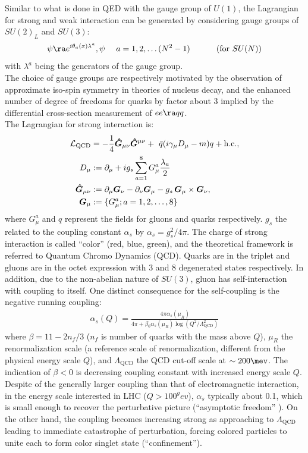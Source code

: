 Similar to what is done in QED with the gauge group of $U(1)$, the Lagrangian for strong and weak interaction can be generated by considering gauge groups of $SU(2)_L$ and $SU(3)$:
$$
\psi \ra e^{i \theta_a(x) \lambda^a}, \psi \,\,\,\,\,\,\,\, a=1,2,\dots (N^2-1) \,\,\,\,\,\, \mbox{\phantom{MM}  (for $SU(N)$)} 
$$
with $\lambda^a$ being the generators of the gauge group. \\
The choice of gauge groups are respectively motivated by the observation of approximate iso-spin symmetry in theories of nucleus decay, and the enhanced number of degree of freedoms  for quarks by factor about 3 implied by the differential cross-section measurement of $ee\ra qq$. \\

The Lagrangian for strong interaction is:
\begin{align}
\mathcal{L}_{\mathrm{QCD}} & = -\frac{1}{4} \bm{\hat{G}}_{\mu\nu} \bm{\hat{G}}^{\mu\nu} + \,\, \bar{q}(i \gamma_\mu D_\mu - m) q + \mathrm{h.c.}, \nonumber \\
D_\mu & := \partial_\mu + ig_s \sum_{a=1}^8 G^a_{\mu}\frac{\lambda_a}{2} \nonumber \\
\bm{\hat{G}}_{\mu\nu} & := \partial_\mu \bm{G}_\nu - \partial_\nu \bm{G}_\mu - g_s \, \bm{G}_\mu \times \bm{G}_\nu, \nonumber \\
\bm{G}_\mu & := \{G^a_\mu; a=1,2,\dots,8\}
\label{eq::QCDLag}
\end{align}
where $G^a_\mu$ and $q$ represent the fields for gluons and quarks respectively.
$g_s$ the related to the coupling constant $\alpha_s$ by $\alpha_s = g_s^2/4\pi$. 
The charge of strong interaction is called ``color'' (red, blue, green), and the theoretical framework is referred to Quantum Chromo Dynamics (QCD). 
Quarks are in the triplet and gluons are in the octet expression with 3 and 8 degenerated states respectively.
In addition, due to the non-abelian nature of $SU(3)$, gluon has self-interaction with coupling to itself. One distinct consequence for the self-coupling is the negative running coupling:
\begin{align}
\alpha_s(Q) = \frac{4\pi\alpha_s(\mu_R)}{4\pi + \beta_0 \alpha_s(\mu_R)\log{(Q^2/\Lambda^2_{\mathrm{QCD}})} }
\end{align}
where $\beta = 11 -2n_f/3$ ($n_f$ is number of quarks with the mass above $Q$), $\mu_R$ the renormalization scale (a reference scale of renormalization, different from the physical energy scale $Q$), and $\Lambda_{\mathrm{QCD}}$ the QCD cut-off scale at $\sim 200\mev$. The indication of $\beta<0$ is decreasing coupling constant with increased energy scale $Q$.
Despite of the generally larger coupling than that of electromagnetic interaction, in the energy scale interested in LHC ($Q>100^gev$), $\alpha_s$ typically about 0.1, which is small enough to recover the perturbative picture (``asymptotic freedom'' 
). 
On the other hand, the coupling becomes increasing strong as approaching to $\Lambda_{\mathrm{QCD}}$ leading to immediate catastrophe of perturbation, forcing colored particles to unite each to form color singlet state (``confinement''). \\


